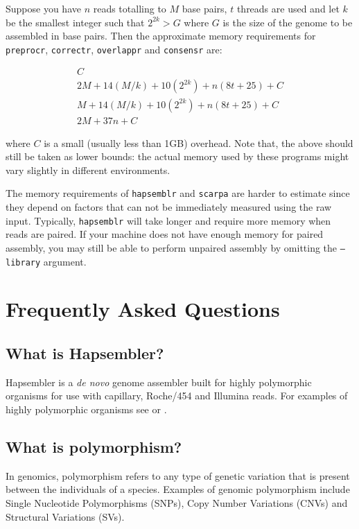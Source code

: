 \documentclass[12pt,a4paper]{report}
\begin{document}
Suppose you have $n$ reads totalling to $M$ base pairs, $t$ threads are used and let $k$ be the smallest integer such that $2^{2k}>G$ where $G$ is the size of the genome to be assembled in base pairs. Then the approximate memory requirements for \texttt{preprocr}, \texttt{correctr}, \texttt{overlappr} and \texttt{consensr} are:

\begin{eqnarray}
C \\
2M + 14(M/k) + 10(2^{2k}) + n(8t + 25) + C \\
M + 14(M/k) + 10(2^{2k}) + n(8t + 25) + C \\
2M + 37n + C
\end{eqnarray}

where $C$ is a small (usually less than 1GB) overhead. Note that, the above should still be taken
as lower bounds: the actual memory used by these programs might vary slightly in different environments.

The memory requirements of \texttt{hapsemblr} and \texttt{scarpa} are harder to estimate since they depend on factors that can not be immediately measured using the raw input. Typically, \texttt{hapsemblr} will take longer and require more memory when reads are paired. If your machine does not have enough memory for paired assembly, you may still be able to perform unpaired assembly by omitting the \texttt{--library} argument.

\section{Frequently Asked Questions}
\label{faq}

\subsection{What is Hapsembler?}

Hapsembler\cite{donmez2} is a \emph{de novo} genome assembler built for highly polymorphic organisms for use with capillary, Roche/454 and Illumina reads. For examples of highly polymorphic organisms see \cite{small2} or \cite{sodergren}.

\subsection{What is polymorphism?}

In genomics, polymorphism refers to any type of genetic variation that is present between the individuals of a species. Examples of genomic polymorphism include Single Nucleotide Polymorphisms (SNPs), Copy Number Variations (CNVs) and Structural Variations (SVs).
\end{document}
